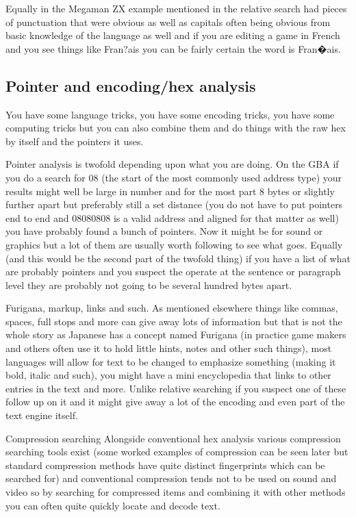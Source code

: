 \documentclass[
]{book}
\begin{document}
Equally in the Megaman ZX example mentioned in the relative search had pieces of punctuation that were obvious as well as capitals often being obvious from basic knowledge of the language as well and if you are editing a game in French and you see things like Fran?ais you can be fairly certain the word is Fran�ais.

\hypertarget{pointer-and-encodinghex-analysis}{%
\subsection{Pointer and encoding/hex analysis}\label{pointer-and-encodinghex-analysis}}

You have some language tricks, you have some encoding tricks, you have some computing tricks but you can also combine them and do things with the raw hex by itself and the pointers it uses.

Pointer analysis is twofold depending upon what you are doing. On the GBA if you do a search for 08 (the start of the most commonly used address type) your results might well be large in number and for the most part 8 bytes or slightly further apart but preferably still a set distance (you do not have to put pointers end to end and 08080808 is a valid address and aligned for that matter as well) you have probably found a bunch of pointers. Now it might be for sound or graphics but a lot of them are usually worth following to see what goes. Equally (and this would be the second part of the twofold thing) if you have a list of what are probably pointers and you suspect the operate at the sentence or paragraph level they are probably not going to be several hundred bytes apart.

Furigana, markup, links and such. As mentioned elsewhere things like commas, spaces, full stops and more can give away lots of information but that is not the whole story as Japanese has a concept named Furigana (in practice game makers and others often use it to hold little hints, notes and other such things), most languages will allow for text to be changed to emphasize something (making it bold, italic and such), you might have a mini encyclopedia that links to other entries in the text and more. Unlike relative searching if you suspect one of these follow up on it and it might give away a lot of the encoding and even part of the text engine itself.

Compression searching Alongside conventional hex analysis various compression searching tools exist (some worked examples of compression can be seen later but standard compression methods have quite distinct fingerprints which can be searched for) and conventional compression tends not to be used on sound and video so by searching for compressed items and combining it with other methods you can often quite quickly locate and decode text.
\end{document}

